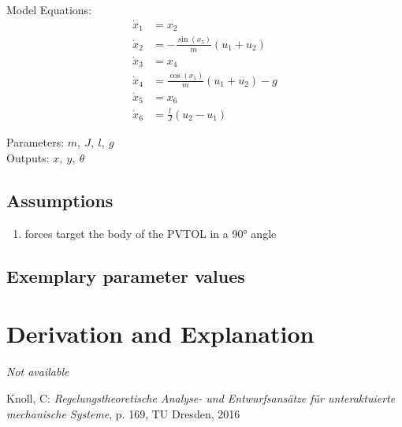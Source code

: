 \documentclass[10pt,a4paper]{article}
\begin{document}
	\noindent Model Equations:	
	\begin{subequations}
	\begin{align}
		\dot{x}_1 &= x_2 	\\ 
		\dot{x}_2 &= -\frac{\sin(x_5)}{m} (u_1 + u_2)  \\
		\dot{x}_3 &= x_4 \\
		\dot{x}_4 &= \frac{\cos(x_5)}{m} (u_1 + u_2) - g \\
		\dot{x}_5 &= x_6 \\
		\dot{x}_6 &= \frac{l}{J} (u_2 - u_1)
	\end{align}
	\end{subequations}

	\noindent
	Parameters: $m, ~J, ~l, ~g$ %
	\\
	Outputs:  $x, ~y, ~\theta$%
	
	
	\subsection{Assumptions} %
		\begin{enumerate} %
			\item forces target the body of the PVTOL in a 90° angle
		\end{enumerate}
	
	
	\subsection{Exemplary parameter values}
	

	
	\section{Derivation and Explanation} %
	
	\textit{Not available}
	
	\begin{thebibliography}{10}		
		Knoll, C: 
		\textit{Regelungstheoretische Analyse- und Entwurfsansätze für unteraktuierte mechanische Systeme}, p. 169, TU Dresden, 2016
	\end{thebibliography}
\end{document}

